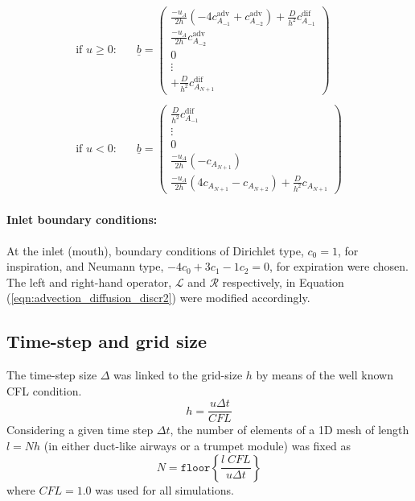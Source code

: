 \begin{equation}
\begin{split}
\text{if }u \geq 0 \text{:}&\quad
\underline{b} =
\left(\begin{array}{c} \frac{-u_A}{2h}\left( -4 c_{A_{-1}}^\mathrm{adv} + c_{A_{-2}}^\mathrm{adv}\right) + \frac{D}{h^2}c_{A_{-1}}^\mathrm{dif} \\
                       \frac{-u_A}{2h}c_{A_{-2}}^\mathrm{adv} \\
                       0 \\
                       \vdots \\
                       + \frac{D}{h^2}c_{A_{N+1}}^\mathrm{dif} \end{array}\right) \\ \\
\text{if }u < 0 \text{:}&\quad
\underline{b} =
\left(\begin{array}{c} \frac{D}{h^2}c_{A_{-1}}^\mathrm{dif} \\
                       \vdots \\
                       0 \\
                       \frac{-u_A}{2h}(-c_{A_{N+1}}) \\
                       \frac{-u_A}{2h}\left(4 c_{A_{N+1}} - c_{A_{N+2}}\right) + \frac{D}{h^2}c_{A_{N+1}} \end{array}\right)
\end{split}
\end{equation}

\paragraph{Inlet boundary conditions:}
At the inlet (mouth), boundary conditions of Dirichlet type, $c_0 = 1$, for inspiration, and Neumann type, $-4c_0 + 3c_1 -1c_2 = 0$, for expiration were chosen.
The left and right-hand operator, $\mathcal{L}$ and $\mathcal{R}$ respectively, in Equation (\ref{eqn:advection_diffusion_discr2}) were modified accordingly.

\subsection*{Time-step and grid size}
The time-step size $\Delta$ was linked to the grid-size $h$ by means of the well known CFL condition.
\begin{equation}
  h = \frac{u \Delta t}{CFL}
\end{equation}
Considering a given time step $\Delta t$, the number of elements of a 1D mesh of length $l = N h$ (in either duct-like airways or a trumpet module) was fixed as
\begin{equation}
  N = \texttt{floor}\left\{\frac{l\;CFL}{u \Delta t}\right\}
\end{equation}
where $CFL=1.0$ was used for all simulations.

